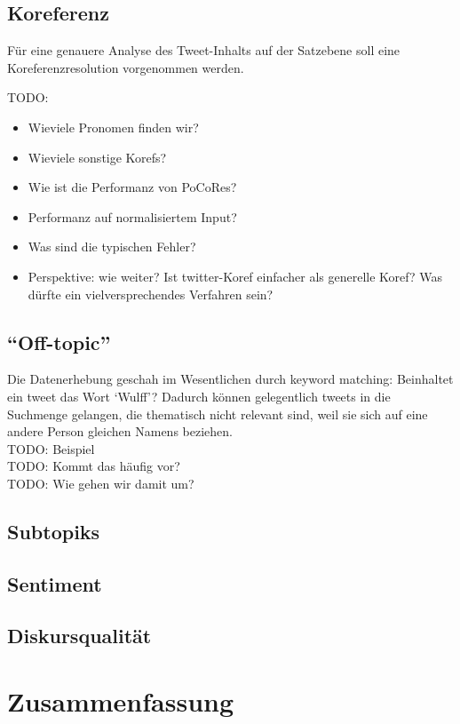 \documentclass[11pt]{article}
\begin{document}
\subsection{Koreferenz}
Für eine genauere Analyse des Tweet-Inhalts auf der Satzebene soll
eine Koreferenzresolution vorgenommen werden.

TODO:
\begin{itemize}
\item Wieviele Pronomen finden wir?
\item Wieviele sonstige Korefs?
\item Wie ist die Performanz von PoCoRes?
\item Performanz auf normalisiertem Input?
\item Was sind die typischen Fehler?
\item Perspektive: wie weiter? Ist twitter-Koref einfacher als
  generelle Koref? Was dürfte ein vielversprechendes Verfahren sein?
\end{itemize}

\subsection{``Off-topic''}
Die Datenerhebung geschah im Wesentlichen durch keyword matching:
Beinhaltet ein tweet das Wort `Wulff'? Dadurch können gelegentlich
tweets in die Suchmenge gelangen, die thematisch nicht relevant sind,
weil sie sich auf eine andere Person gleichen Namens beziehen.\\
TODO: Beispiel\\
TODO: Kommt das häufig vor?\\
TODO: Wie gehen wir damit um?

\subsection{Subtopiks}

\subsection{Sentiment}

\subsection{Diskursqualität}

\section{Zusammenfassung}
\end{document}
